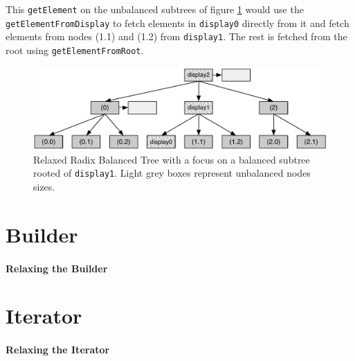 This \texttt{getElement} on the unbalanced subtrees of figure \ref{Balanced_subtrees}  would use the \texttt{getElementFromDisplay} to fetch elements in \texttt{display0} directly from it and fetch elements from nodes (1.1) and (1.2) from \texttt{display1}. The rest is fetched from the root using \texttt{getElementFromRoot}.

\begin{figure}[h!]
  \centering
  \includegraphics[width=\textwidth]{Figures/Balanced_subtrees}
  \caption{Relaxed Radix Balanced Tree with a focus on a balanced subtree rooted of \texttt{display1}. Light grey boxes represent unbalanced nodes sizes.}
  \label{Balanced_subtrees}
\end{figure}



\section{Builder}


\paragraph{Relaxing the Builder}




\section{Iterator}

\paragraph{Relaxing the Iterator}







